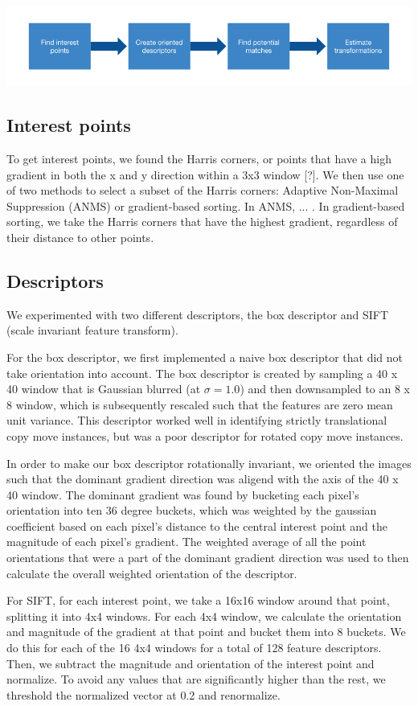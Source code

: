 \documentclass[12pt]{article}
\begin{document}
\includegraphics[width=1.0\linewidth]{./gfx/cm_pipeline.png}

\subsection*{Interest points}
To get interest points, we found the Harris corners, or points that have a high gradient in both the x and y direction within a 3x3 window [?]. We then use one of two methods to select a subset of the Harris corners: Adaptive Non-Maximal Suppression (ANMS) or gradient-based sorting. In ANMS, ... . In gradient-based sorting, we take the Harris corners that have the highest gradient, regardless of their distance to other points. 

\subsection*{Descriptors}
We experimented with two different descriptors, the box descriptor and SIFT (scale invariant feature transform).

For the box descriptor, we first implemented a naive box descriptor that did not take orientation into account. The box descriptor is created by sampling a 40 x 40 window that is Gaussian blurred (at $\sigma = 1.0$) and then downsampled to an 8 x 8 window, which is subsequently rescaled such that the features are zero mean unit variance. This descriptor worked well in identifying strictly translational copy move instances, but was a poor descriptor for rotated copy move instances.

In order to make our box descriptor rotationally invariant, we oriented the images such that the dominant gradient direction was aligend with the axis of the 40 x 40 window. The dominant gradient was found by bucketing each pixel's orientation into ten 36 degree buckets, which was weighted by the gaussian coefficient based on each pixel's distance to the central interest point and the magnitude of each pixel's gradient. The weighted average of all the point orientations that were a part of the dominant gradient direction was used to then calculate the overall weighted orientation of the descriptor.

For SIFT, for each interest point, we take a 16x16 window around that point, splitting it into 4x4 windows. For each 4x4 window, we calculate the orientation and magnitude of the gradient at that point and bucket them into 8 buckets. We do this for each of the 16 4x4 windows for a total of 128 feature descriptors. Then, we subtract the magnitude and orientation of the interest point and normalize. To avoid any values that are significantly higher than the rest, we threshold the normalized vector at 0.2 and renormalize.
\end{document}
